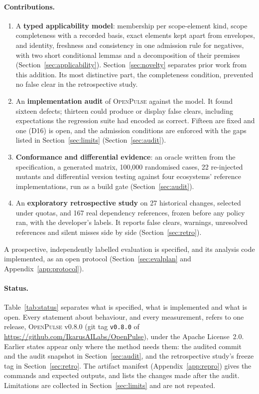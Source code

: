 \documentclass[11pt,a4paper]{article}
\newcommand{\op}{\textsc{OpenPulse}}
\newcommand{\code}[1]{\texttt{#1}}
\newcommand{\release}{v0.8.0}
\begin{document}
\paragraph{Contributions.}
\begin{enumerate}[leftmargin=*]
  \item A \textbf{typed applicability model}: membership per
    scope-element kind, scope completeness with a recorded basis, exact
    elements kept apart from envelopes, and identity, freshness and
    consistency in one admission rule for negatives, with two short
    conditional lemmas and a decomposition of their premises
    (Section~\ref{sec:applicability}). Section~\ref{sec:novelty}
    separates prior work from this addition. Its most distinctive part,
    the completeness condition, prevented no false clear in the
    retrospective study.
  \item An \textbf{implementation audit} of \op{} against the model. It
    found sixteen defects; thirteen could produce or display false
    clears, including expectations the regression suite had encoded as
    correct. Fifteen are fixed and one (D16) is open, and the admission
    conditions are enforced with the gaps listed in
    Section~\ref{sec:limits}
    (Section~\ref{sec:audit}).
  \item \textbf{Conformance and differential evidence}: an oracle
    written from the specification, a generated matrix, 100{,}000
    randomised cases, 22 re-injected mutants and differential version
    testing against four ecosystems' reference implementations, run as
    a build gate (Section~\ref{sec:audit}).
  \item An \textbf{exploratory retrospective study} on 27 historical
    changes, selected under quotas, and 167 real dependency references,
    frozen before any policy ran, with the developer's labels. It
    reports false clears, warnings, unresolved references and silent
    misses side by side (Section~\ref{sec:retro}).
\end{enumerate}
A prospective, independently labelled evaluation is specified, and its
analysis code implemented, as an open protocol
(Section~\ref{sec:evalplan} and Appendix~\ref{app:protocol}).

\paragraph{Status.} Table~\ref{tab:status} separates what is
specified, what is implemented and what is open. Every statement about behaviour, and every
measurement, refers to one release, \op{} \release{} (git tag
\code{\release{}} of \url{https://github.com/IkarusAILabs/OpenPulse}),
under the Apache License~2.0. Earlier states appear only where the method needs
them: the audited commit and the audit snapshot in
Section~\ref{sec:audit}, and the retrospective study's freeze tag in
Section~\ref{sec:retro}. The artifact manifest
(Appendix~\ref{app:repro}) gives the commands
and expected outputs, and lists the changes made after the audit.
Limitations are collected in Section~\ref{sec:limits} and are not
repeated.
\end{document}
